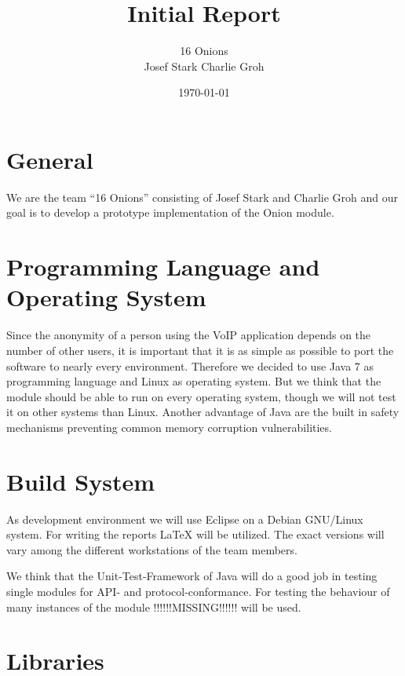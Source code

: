 \documentclass{article}
\begin{document}
\title{\Huge Initial Report \normalsize}
\date{\today}
\author{\LARGE 16 Onions \normalsize \\[5pt] Josef Stark \hspace{20pt} Charlie Groh}
\maketitle
\let\thefootnote\relax{}

\section{General}
We are the team ``16 Onions'' consisting of Josef Stark and Charlie Groh
and our goal is to develop a prototype implementation of the Onion module.

\section{Programming Language and Operating System}
Since the anonymity of a person using the VoIP application depends on the
number of other users, it is important that it is as simple as possible to port
the software to nearly every environment. Therefore we decided to use Java 7
as programming language and Linux as operating system. But we think that the
module should be able to run on every operating system, though we will not test
it on other systems than Linux. Another advantage of Java are the built in
safety mechanisms preventing common memory corruption vulnerabilities.

\section{Build System}
As development environment we will use Eclipse on a Debian GNU/Linux system. For
writing the reports LaTeX will be utilized. The exact versions will vary among the
different workstations of the team members.

We think that the Unit-Test-Framework of Java will do a good job in testing
single modules for API- and protocol-conformance. For testing the behaviour of
many instances of the module !!!!!!MISSING!!!!!! will be used.

\section{Libraries}
\end{document}

